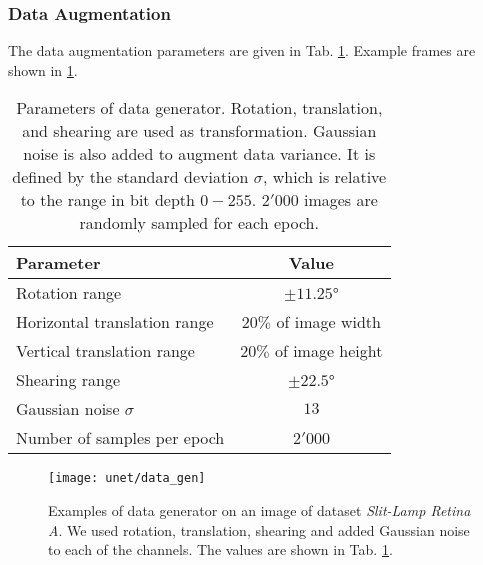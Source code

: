 \clearpage
\subsubsection{Data Augmentation} \label{results_data_gen}

The data augmentation parameters are given in Tab. \ref{tab:data_gen_param}.
Example frames are shown in \ref{fig:data_gen}.

\begin{table}[!htbp]
   \centering
   \caption[Data generator parameters]{Parameters of data generator. Rotation, translation, and shearing are used as transformation. Gaussian noise is also added to augment data variance. It is defined by the standard deviation $\sigma$, which is relative to the range in bit depth $0-255$. $2'000$ images are randomly sampled for each epoch.}
   \begin{tabular}{l|c}
      \toprule
      \textbf{Parameter} & \textbf{Value} \\
      \midrule
      Rotation range & $\pm11.25$° \\
      Horizontal translation range & $20\%$ of image width \\
      Vertical translation range & $20\%$ of image height \\
      Shearing range & $\pm22.5$° \\
      \midrule
      Gaussian noise $\sigma$ & $13$ \\
      \midrule
      Number of samples per epoch & $2'000$ \\
      \bottomrule
   \end{tabular}
   \label{tab:data_gen_param}
\end{table}
\vspace{30pt}

\begin{figure}[!htbp]
  \centering
  \texttt{[image: unet/data\_gen]}
  \caption[Examples of data generator]{Examples of data generator on an image of dataset \textit{Slit-Lamp Retina A}. We used rotation, translation, shearing and added Gaussian noise to each of the channels. The values are shown in Tab. \ref{tab:data_gen_param}.}
  \label{fig:data_gen}
\end{figure}


